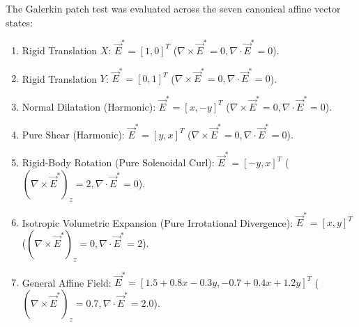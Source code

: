 \documentclass[VANCOUVER,Times1COL]{WileyNJD-v5}
\begin{document}
The Galerkin patch test was evaluated across the seven canonical affine vector states:
\begin{enumerate}
    \item Rigid Translation $X$: $\vec{E}^* = [1, 0]^T$ ($\nabla \times \vec{E}^* = 0, \nabla \cdot \vec{E}^* = 0$).
    \item Rigid Translation $Y$: $\vec{E}^* = [0, 1]^T$ ($\nabla \times \vec{E}^* = 0, \nabla \cdot \vec{E}^* = 0$).
    \item Normal Dilatation (Harmonic): $\vec{E}^* = [x, -y]^T$ ($\nabla \times \vec{E}^* = 0, \nabla \cdot \vec{E}^* = 0$).
    \item Pure Shear (Harmonic): $\vec{E}^* = [y, x]^T$ ($\nabla \times \vec{E}^* = 0, \nabla \cdot \vec{E}^* = 0$).
    \item Rigid-Body Rotation (Pure Solenoidal Curl): $\vec{E}^* = [-y, x]^T$ ($(\nabla \times \vec{E}^*)_z = 2, \nabla \cdot \vec{E}^* = 0$).
    \item Isotropic Volumetric Expansion (Pure Irrotational Divergence): $\vec{E}^* = [x, y]^T$ ($(\nabla \times \vec{E}^*)_z = 0, \nabla \cdot \vec{E}^* = 2$).
    \item General Affine Field: $\vec{E}^* = [1.5 + 0.8x - 0.3y, -0.7 + 0.4x + 1.2y]^T$ ($(\nabla \times \vec{E}^*)_z = 0.7, \nabla \cdot \vec{E}^* = 2.0$).
\end{enumerate}
\end{document}
